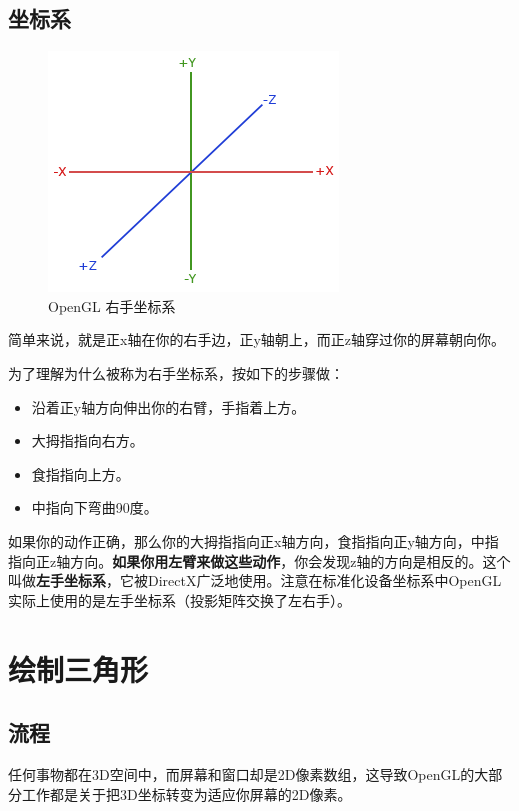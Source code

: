 \documentclass[UTF8,a4paper,12pt]{ctexbook}
\begin{document}
		\subsection{坐标系}
			\begin{figure}[H]
				\centering
				\includegraphics[width=.62\linewidth]{coordinate_systems_right_handed}
				\caption{OpenGL 右手坐标系}
			\end{figure}			
			
			简单来说，就是正x轴在你的右手边，正y轴朝上，而正z轴穿过你的屏幕朝向你。
			
			为了理解为什么被称为右手坐标系，按如下的步骤做：
			\begin{itemize}[itemindent = 1em]
				\item 沿着正y轴方向伸出你的右臂，手指着上方。
				\item 大拇指指向右方。
				\item 食指指向上方。
				\item 中指向下弯曲90度。
			\end{itemize}
			
			如果你的动作正确，那么你的大拇指指向正x轴方向，食指指向正y轴方向，中指指向正z轴方向。\textbf{如果你用左臂来做这些动作}，你会发现z轴的方向是相反的。这个叫做\textbf{左手坐标系}，它被DirectX广泛地使用。注意在标准化设备坐标系中OpenGL实际上使用的是左手坐标系（投影矩阵交换了左右手）。
				
	\section{绘制三角形}
	
		\subsection{流程}
			任何事物都在3D空间中，而屏幕和窗口却是2D像素数组，这导致OpenGL的大部分工作都是关于把3D坐标转变为适应你屏幕的2D像素。
			
\end{document}
